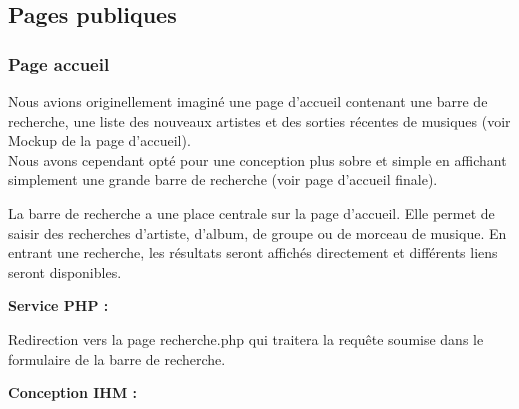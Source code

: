 \newpage


    \clearpage

    \subsection{Pages publiques}

		\subsubsection{Page accueil}

            \begin{paragraphe}
                Nous avions originellement imaginé une page d'accueil contenant une barre de recherche, une liste des nouveaux artistes et des sorties récentes de musiques (voir Mockup de la page d'accueil).\\
                Nous avons cependant opté pour une conception plus sobre et simple en affichant simplement une grande barre de recherche (voir page d'accueil finale).
            \end{paragraphe}

			\begin{paragraphe}
                La barre de recherche a une place centrale sur la page d'accueil. Elle permet de saisir des recherches d’artiste, d’album, de groupe ou de morceau de musique.
				En entrant une recherche, les résultats seront affichés directement et différents liens seront disponibles.
			\end{paragraphe}

			\begin{paragraphe}
				\textbf{Service PHP :}
            \end{paragraphe}

            \begin{paragraphe}
                Redirection vers la page recherche.php qui traitera la requête soumise dans le formulaire de la barre de recherche.
			\end{paragraphe}

			\begin{paragraphe}
				\textbf{Conception IHM :}
            \end{paragraphe}


